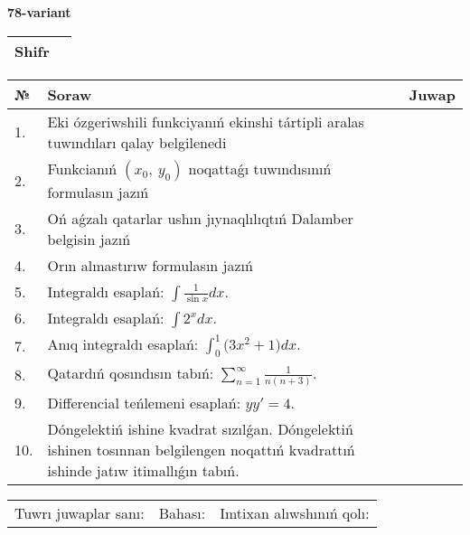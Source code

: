 \documentclass{article}
\begin{document}
  \egroup
  
  \newpage
  
  
  \textbf{78-variant}\\
  
  \bgroup
  \def\arraystretch{1.6} %
  
  \begin{tabular}{|m{5.7cm}|m{9.5cm}|}
  \hline
  Shifr & \\
  \hline
  \end{tabular}
  
  \vspace{1cm}
  
  \begin{tabular}{|m{0.7cm}|m{10cm}|m{4cm}|}
  \hline
  № & Soraw & Juwap \\
  \hline
  1. & Eki ózgeriwshili funkciyanıń ekinshi tártipli aralas tuwındıları qalay belgilenedi &  \\
  \hline
  2. & Funkcianıń \((x_{0},\ y_{0})\) noqattaǵı tuwındısınıń formulasın jazıń &  \\
  \hline
  3. & Oń aǵzalı qatarlar ushın jıynaqlılıqtıń Dalamber belgisin jazıń &  \\
  \hline
  4. & Orın almastırıw formulasın jazıń &  \\
  \hline
  5. & Integraldı esaplań: \(\int{\frac{1}{\sin x}dx}\). &  \\
  \hline
  6. & Integraldı esaplań: \(\int{2^{x}dx}\). &  \\
  \hline
  7. & Anıq integraldı esaplań: \(\int_{0}^{1}{(3x^2 } + 1)dx\). &  \\
  \hline
  8. & Qatardıń qosındısın tabıń: \(\sum_{n = 1}^{\infty}\frac{1}{n(n + 3)}\). &  \\
  \hline
  9. & Differencial teńlemeni esaplań: \(yy' = 4\). &  \\
  \hline
  10. & Dóngelektiń ishine kvadrat sızılǵan. Dóngelektiń ishinen tosınnan belgilengen noqattıń kvadrattıń ishinde jatıw itimallıǵın tabıń. &  \\
  \hline
  \end{tabular}
  
  \vspace{1cm}
  
  \begin{tabular}{lll}
  Tuwrı juwaplar sanı: \underline{\hspace{1.5cm}} & 
  Bahası: \underline{\hspace{1.5cm}} & 
  Imtixan alıwshınıń qolı: \underline{\hspace{2cm}} \\
  \end{tabular}
  
\end{document}
